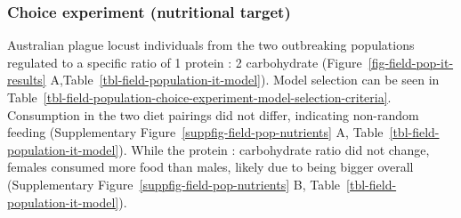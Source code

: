 \documentclass[
]{article}
\begin{document}
\subsubsection{Choice experiment (nutritional
target)}\label{choice-experiment-nutritional-target}

Australian plague locust individuals from the two outbreaking
populations regulated to a specific ratio of 1 protein : 2 carbohydrate
(Figure~\ref{fig-field-pop-it-results}
A,Table~\ref{tbl-field-population-it-model}). Model selection can be
seen in
Table~\ref{tbl-field-population-choice-experiment-model-selection-criteria}.
Consumption in the two diet pairings did not differ, indicating
non-random feeding
(Supplementary Figure~\ref{suppfig-field-pop-nutrients} A,
Table~\ref{tbl-field-population-it-model}). While the protein :
carbohydrate ratio did not change, females consumed more food than
males, likely due to being bigger overall
(Supplementary Figure~\ref{suppfig-field-pop-nutrients} B,
Table~\ref{tbl-field-population-it-model}).
\end{document}
